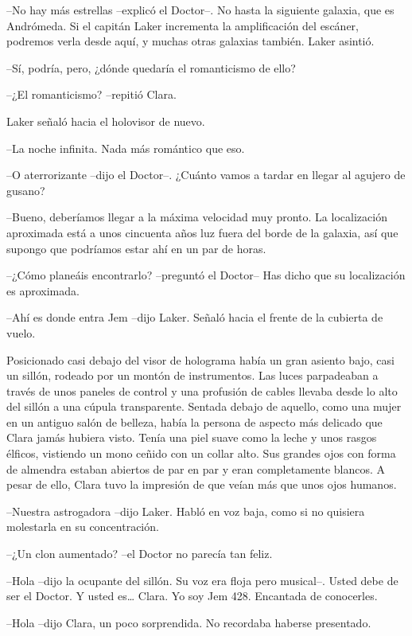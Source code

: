 {--No hay más estrellas --explicó el Doctor--. No hasta la siguiente
 galaxia, que es Andrómeda. Si el capitán Laker incrementa la
 amplificación del escáner, podremos verla desde aquí, y muchas otras
galaxias también. Laker asintió.}

{--Sí, podría, pero, ¿dónde quedaría el romanticismo de ello?}

{--¿El romanticismo? --repitió Clara.}

{Laker señaló hacia el holovisor de nuevo.}

{--La noche infinita. Nada más romántico que eso.}

{--O aterrorizante --dijo el Doctor--. ¿Cuánto vamos a tardar en llegar
al agujero de gusano?}

{--Bueno, deberíamos llegar a la máxima velocidad muy pronto. La
 localización aproximada está a unos cincuenta años luz fuera del borde
 de la galaxia, así que supongo que podríamos estar ahí en un par de
horas.}

{--¿Cómo planeáis encontrarlo? --preguntó el Doctor-- Has dicho que su
localización es aproximada.}

{--Ahí es donde entra Jem --dijo Laker. Señaló hacia el frente de la
cubierta de vuelo.}

{Posicionado casi debajo del visor de holograma había un gran asiento
 bajo, casi un sillón, rodeado por un montón de instrumentos. Las luces
 parpadeaban a través de unos paneles de control y una profusión de
 cables llevaba desde lo alto del sillón a una cúpula transparente.
 Sentada debajo de aquello, como una mujer en un antiguo salón de
 belleza, había la persona de aspecto más delicado que Clara jamás
 hubiera visto. Tenía una piel suave como la leche y unos rasgos élficos,
 vistiendo un mono ceñido con un collar alto. Sus grandes ojos con forma
 de almendra estaban abiertos de par en par y eran completamente blancos.
 A pesar de ello, Clara tuvo la impresión de que veían más que unos ojos
humanos.}

{--Nuestra astrogadora --dijo Laker. Habló en voz baja, como si no
quisiera molestarla en su concentración.}

{--¿Un clon aumentado? --el Doctor no parecía tan feliz.}

{--Hola --dijo la ocupante del sillón. Su voz era floja pero musical--.
 Usted debe de ser el Doctor. Y usted es\ldots{} Clara. Yo soy Jem 428.
Encantada de conocerles.}

{--Hola --dijo Clara, un poco sorprendida. No recordaba haberse
presentado.}

